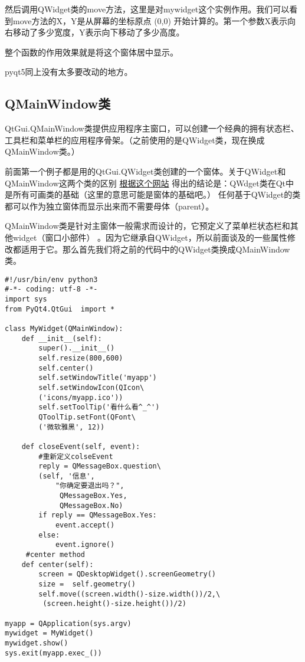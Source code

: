 \documentclass[11pt,oneside]{article}
\begin{document}
然后调用QWidget类的move方法，这里是对mywidget这个实例作用。我们可以看到move方法的X，Y是从屏幕的坐标原点 (0,0) 开始计算的。第一个参数X表示向右移动了多少宽度，Y表示向下移动了多少高度。

整个函数的作用效果就是将这个窗体居中显示。

pyqt5同上没有太多要改动的地方。

\subsection{QMainWindow类}
\label{sec:orgheadline10}
QtGui.QMainWindow类提供应用程序主窗口，可以创建一个经典的拥有状态栏、工具栏和菜单栏的应用程序骨架。（之前使用的是QWidget类，现在换成QMainWindow类。）

前面第一个例子都是用的QtGui.QWidget类创建的一个窗体。关于QWidget和QMainWindow这两个类的区别 \href{http://stackoverflow.com/questions/3298792/whats-the-difference-between-qmainwindow-and-qwidget-and-qdialog}{根据这个网站} 得出的结论是：QWdget类在Qt中是所有可画类的基础（这里的意思可能是窗体的基础吧。） 任何基于QWidget的类都可以作为独立窗体而显示出来而不需要母体（parent）。

QMainWindow类是针对主窗体一般需求而设计的，它预定义了菜单栏状态栏和其他widget（窗口小部件） 。因为它继承自QWidget，所以前面谈及的一些属性修改都适用于它。那么首先我们将之前的代码中的QWidget类换成QMainWindow类。

\begin{verbatim}
#!/usr/bin/env python3
#-*- coding: utf-8 -*-
import sys
from PyQt4.QtGui  import *

class MyWidget(QMainWindow):
    def __init__(self):
        super().__init__()
        self.resize(800,600)
        self.center()
        self.setWindowTitle('myapp')
        self.setWindowIcon(QIcon\
        ('icons/myapp.ico'))
        self.setToolTip('看什么看^_^')
        QToolTip.setFont(QFont\
        ('微软雅黑', 12))

    def closeEvent(self, event):
        #重新定义colseEvent
        reply = QMessageBox.question\
        (self, '信息',
            "你确定要退出吗？",
             QMessageBox.Yes,
             QMessageBox.No)
        if reply == QMessageBox.Yes:
            event.accept()
        else:
            event.ignore()
     #center method
    def center(self):
        screen = QDesktopWidget().screenGeometry()
        size =  self.geometry()
        self.move((screen.width()-size.width())/2,\
         (screen.height()-size.height())/2)

myapp = QApplication(sys.argv)
mywidget = MyWidget()
mywidget.show()
sys.exit(myapp.exec_())
\end{verbatim}
\end{document}
